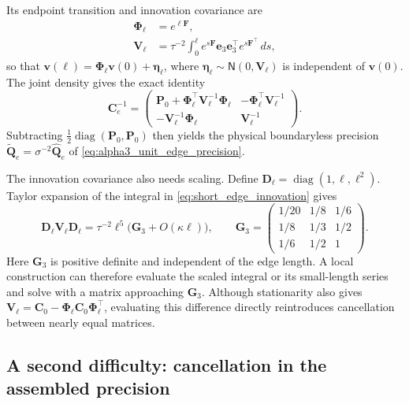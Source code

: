 \documentclass[11pt,a4paper]{article}
\theoremstyle{plain}
\theoremstyle{definition}
\begin{document}
Its endpoint transition and innovation covariance are
\begin{align}
\boldsymbol\Phi_\ell&=e^{\ell\mathbf F},\\
\mathbf V_\ell&=\tau^{-2}\int_0^\ell
 e^{s\mathbf F}\mathbf e_3\mathbf e_3^\top e^{s\mathbf F^\top}\,ds,
\label{eq:short_edge_innovation}
\end{align}
so that $\boldsymbol v(\ell)=\boldsymbol\Phi_\ell\boldsymbol v(0)
+\boldsymbol\eta_\ell$, where
$\boldsymbol\eta_\ell\sim\mathsf N(0,\mathbf V_\ell)$ is independent
of $\boldsymbol v(0)$. The joint density gives the exact identity
\begin{equation}
\mathbf C_e^{-1}=
\begin{pmatrix}
\mathbf P_0+\boldsymbol\Phi_\ell^\top\mathbf V_\ell^{-1}\boldsymbol\Phi_\ell
&-\boldsymbol\Phi_\ell^\top\mathbf V_\ell^{-1}\\
-\mathbf V_\ell^{-1}\boldsymbol\Phi_\ell&\mathbf V_\ell^{-1}
\end{pmatrix}.
\label{eq:short_edge_transition_precision}
\end{equation}
Subtracting $\frac12\operatorname{diag}(\mathbf P_0,\mathbf P_0)$
then yields the physical boundaryless precision
$\widetilde{\mathbf Q}_e=\sigma^{-2}\widehat{\mathbf Q}_e$ of
\eqref{eq:alpha3_unit_edge_precision}.

The innovation covariance also needs scaling. Define
$\mathbf D_\ell=\operatorname{diag}(1,\ell,\ell^2)$. Taylor expansion
of the integral in \eqref{eq:short_edge_innovation} gives
\begin{equation}
\mathbf D_\ell\mathbf V_\ell\mathbf D_\ell
=\tau^{-2}\ell^5\bigl(\mathbf G_3+O(\kappa\ell)\bigr),
\qquad
\mathbf G_3=
\begin{pmatrix}
1/20&1/8&1/6\\1/8&1/3&1/2\\1/6&1/2&1
\end{pmatrix}.
\label{eq:short_edge_scaled_innovation}
\end{equation}
Here $\mathbf G_3$ is positive definite and independent of the edge
length. A local construction can therefore evaluate the scaled integral
or its small-length series and solve with a matrix approaching
$\mathbf G_3$. Although stationarity also gives
$\mathbf V_\ell=\mathbf C_0-
\boldsymbol\Phi_\ell\mathbf C_0\boldsymbol\Phi_\ell^\top$,
evaluating this difference directly reintroduces cancellation between
nearly equal matrices.

\subsection{A second difficulty: cancellation in the assembled precision}
\end{document}
